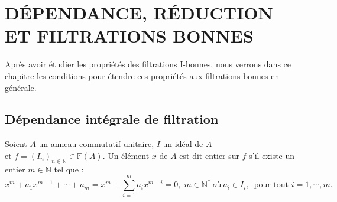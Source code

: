 \chapter{DÉPENDANCE, RÉDUCTION ET FILTRATIONS BONNES}

Après avoir étudier les propriétés des filtrations I-bonnes, nous verrons dans ce chapitre les conditions pour étendre ces propriétés aux filtrations bonnes en générale.
\section{Dépendance intégrale de filtration}
\begin{madefinition}
	Soient $A$ un anneau commutatif unitaire, $I$ un idéal de $A$\\
	et $f=(I_n)_{n\in \mathbb{N}} \in \mathbb{F}(A)$. Un élément $x$ de $A$ est dit entier sur $f$ s'il existe un entier $m \in \mathbb{N}$ tel que : 
	\[ 	x^m + a_1 x^{m-1} + \cdots + a_m = x^m + \sum_{i=1}^{m} a_i x^{m-i} = 0, \; m \in \mathbb{N^*} \ où \ a_i \in I_i,\, \text{ pour tout } i=1, \cdots ,m. \]	
\end{madefinition}

